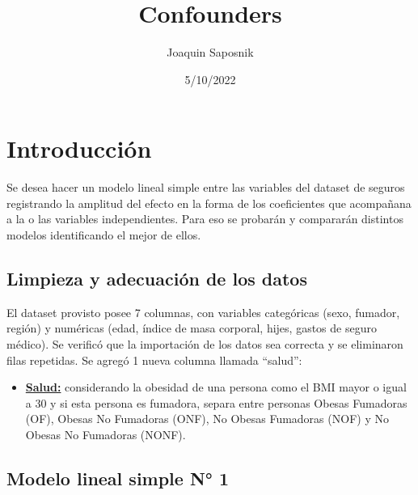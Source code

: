 \documentclass[
  letterpaper,
]{book}
\title{Confounders}
\author{Joaquin Saposnik}
\date{5/10/2022}
\providecommand{\tightlist}{%
  \setlength{\itemsep}{0pt}\setlength{\parskip}{0pt}}\usepackage{longtable,booktabs,array}
\renewcommand*\contentsname{Table of contents}
\newcommand\contentsname{Table of contents}
\begin{document}
\frontmatter
\maketitle
\ifdefined\Shaded\renewenvironment{Shaded}{\begin{tcolorbox}[interior hidden, breakable, enhanced, frame hidden, borderline west={3pt}{0pt}{shadecolor}, sharp corners, boxrule=0pt]}{\end{tcolorbox}}\fi

\renewcommand*\contentsname{Table of contents}
{
\hypersetup{linkcolor=}
\setcounter{tocdepth}{5}
\tableofcontents
}
\mainmatter
{}

\hypertarget{introducciuxf3n}{%
\chapter*{Introducción}\label{introducciuxf3n}}

Se desea hacer un modelo lineal simple entre las variables del dataset
de seguros registrando la amplitud del efecto en la forma de los
coeficientes que acompañana a la o las variables independientes. Para
eso se probarán y compararán distintos modelos identificando el mejor de
ellos.

\hypertarget{limpieza-y-adecuaciuxf3n-de-los-datos}{%
\section*{Limpieza y adecuación de los
datos}\label{limpieza-y-adecuaciuxf3n-de-los-datos}}

El dataset provisto posee 7 columnas, con variables categóricas (sexo,
fumador, región) y numéricas (edad, índice de masa corporal, hijes,
gastos de seguro médico). Se verificó que la importación de los datos
sea correcta y se eliminaron filas repetidas. Se agregó 1 nueva columna
llamada ``salud'':

\begin{itemize}
\tightlist
\item
  \uline{\textbf{Salud:}} considerando la obesidad de una persona como
  el BMI mayor o igual a 30 y si esta persona es fumadora, separa entre
  personas Obesas Fumadoras (OF), Obesas No Fumadoras (ONF), No Obesas
  Fumadoras (NOF) y No Obesas No Fumadoras (NONF).
\end{itemize}

\hypertarget{modelo-lineal-simple-n-1}{%
\section*{Modelo lineal simple N° 1}\label{modelo-lineal-simple-n-1}}
\end{document}
